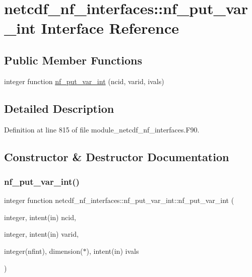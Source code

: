 \hypertarget{interfacenetcdf__nf__interfaces_1_1nf__put__var__int}{}\section{netcdf\+\_\+nf\+\_\+interfaces\+:\+:nf\+\_\+put\+\_\+var\+\_\+int Interface Reference}
\label{interfacenetcdf__nf__interfaces_1_1nf__put__var__int}
\subsection*{Public Member Functions}
\begin{DoxyCompactItemize}
\item 
integer function \hyperlink{interfacenetcdf__nf__interfaces_1_1nf__put__var__int_aac3b8f0ed62b8bc3cd011f0af8aefc9a}{nf\+\_\+put\+\_\+var\+\_\+int} (ncid, varid, ivals)
\end{DoxyCompactItemize}


\subsection{Detailed Description}


Definition at line 815 of file module\+\_\+netcdf\+\_\+nf\+\_\+interfaces.\+F90.



\subsection{Constructor \& Destructor Documentation}
\mbox{\label{interfacenetcdf__nf__interfaces_1_1nf__put__var__int_aac3b8f0ed62b8bc3cd011f0af8aefc9a}} 
\subsubsection{\texorpdfstring{nf\+\_\+put\+\_\+var\+\_\+int()}{nf\_put\_var\_int()}}
{\footnotesize\ttfamily integer function netcdf\+\_\+nf\+\_\+interfaces\+::nf\+\_\+put\+\_\+var\+\_\+int\+::nf\+\_\+put\+\_\+var\+\_\+int (\begin{DoxyParamCaption}\item[{integer, intent(in)}]{ncid,  }\item[{integer, intent(in)}]{varid,  }\item[{integer(nfint), dimension($\ast$), intent(in)}]{ivals }\end{DoxyParamCaption})}



